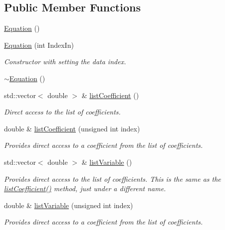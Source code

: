 \subsection*{Public Member Functions}
\begin{DoxyCompactItemize}
\item 
\hyperlink{classosea_1_1ofreq_1_1_equation_a68511fc719250ed80f86c50de9136733}{Equation} ()
\item 
\hyperlink{classosea_1_1ofreq_1_1_equation_a37fec641aec75302c37590d191421790}{Equation} (int Index\-In)
\begin{DoxyCompactList}\small\item\em Constructor with setting the data index. \end{DoxyCompactList}\item 
\hyperlink{classosea_1_1ofreq_1_1_equation_a097243d0dfd608330fc91f115a0d15bb}{$\sim$\-Equation} ()
\item 
std\-::vector$<$ double $>$ \& \hyperlink{classosea_1_1ofreq_1_1_equation_a40be3415ddc7ebc7aa93829f3eb750f0}{list\-Coefficient} ()
\begin{DoxyCompactList}\small\item\em Direct access to the list of coefficients. \end{DoxyCompactList}\item 
double \& \hyperlink{classosea_1_1ofreq_1_1_equation_acce479a17f90df340bcf9cabf06258a2}{list\-Coefficient} (unsigned int index)
\begin{DoxyCompactList}\small\item\em Provides direct access to a coefficient from the list of coefficients. \end{DoxyCompactList}\item 
std\-::vector$<$ double $>$ \& \hyperlink{classosea_1_1ofreq_1_1_equation_a736b8cff2908ad73abad4ca4533b830d}{list\-Variable} ()
\begin{DoxyCompactList}\small\item\em Provides direct access to the list of coefficients. This is the same as the \hyperlink{classosea_1_1ofreq_1_1_equation_a40be3415ddc7ebc7aa93829f3eb750f0}{list\-Coefficient()} method, just under a different name. \end{DoxyCompactList}\item 
double \& \hyperlink{classosea_1_1ofreq_1_1_equation_a9d969fd44848f29f135213aaa520fabe}{list\-Variable} (unsigned int index)
\begin{DoxyCompactList}\small\item\em Provides direct access to a coefficient from the list of coefficients. \end{DoxyCompactList}\item 

\end{DoxyCompactItemize}
